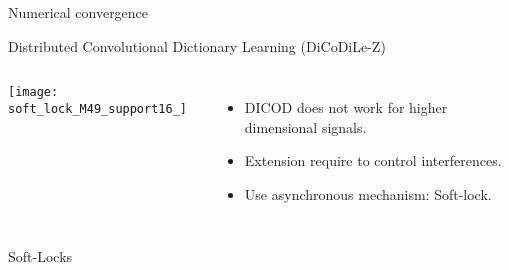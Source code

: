 \documentclass[prez_parietal.tex]{subfiles}
\begin{document}
\begin{frame}{Numerical convergence}

\centering
{}
\end{frame}


\begin{frame}{Distributed Convolutional Dictionary Learning (DiCoDiLe-Z)}

\begin{columns}[c]
    \texttt{[image: soft\_lock\_M49\_support16\_]}
    \begin{itemize}[<+->]\itemsep1em
        \item DICOD does not work for higher dimensional signals.
        \item Extension require to control interferences. 
        \item Use asynchronous mechanism: Soft-lock.
    \end{itemize}
\end{columns}

\end{frame}

\begin{frame}{Soft-Locks }

{
    \centering
    \\
}
\end{frame}


%
%
\end{document}
